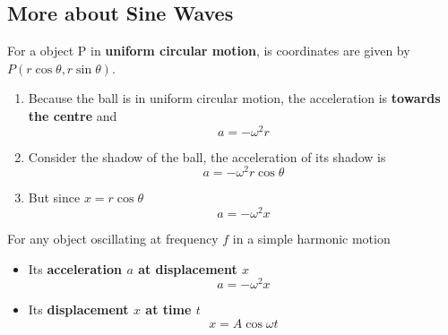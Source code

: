 \subsection{More about Sine Waves}

For a object P in \textbf{uniform circular motion}, is coordinates are given by $P(r\cos\theta,r\sin\theta)$.
\begin{enumerate}
    \item Because the ball is in uniform circular motion, the acceleration is \textbf{towards the centre} and
        $$a=-\omega^2r$$
    \item Consider the shadow of the ball, the acceleration of its shadow is
        $$a=-\omega^2r\cos\theta$$
    \item But since $x=r\cos\theta$
        $$a=-\omega^2x$$
\end{enumerate}

For any object oscillating at frequency $f$ in a simple harmonic motion
\begin{itemize}
    \item Its \textbf{acceleration $a$ at displacement $x$}
        $$a=-\omega^2x$$
    \item Its \textbf{displacement $x$ at time $t$}
        $$x=A\cos\omega t$$
\end{itemize}

